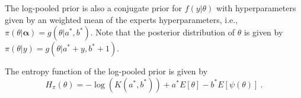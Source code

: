 \documentclass[a4paper, notitlepage, 10pt]{article}
\begin{document}
The log-pooled prior is also a conjugate prior for $f(y|\theta)$ with hyperparameters given by an weighted mean of the experts hyperparameters, i.e., $\pi(\theta|\boldsymbol\alpha) = g(\theta | a^*, b^*)$.
Note that the posterior distribution of $\theta$ is given by $\pi(\theta | y) = g(\theta | a^* + y, b^* + 1)$.

The entropy function of the log-pooled prior is given by
\begin{equation}
\label{eq:entropypriorEF}
H_\pi(\theta) = - \log (K(a^*, b^*)) + a^*  E[\theta]-  b^*  E[\psi(\theta)] \: .
\end{equation}
\end{document}
